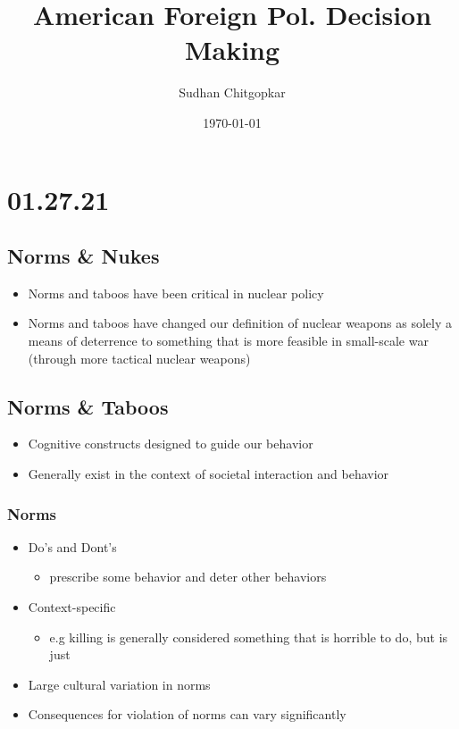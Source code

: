 \documentclass[11pt]{article}
\author{Sudhan Chitgopkar}
\date{\today}
\title{American Foreign Pol. Decision Making}
\begin{document}
\maketitle
\tableofcontents \clearpage\section{01.27.21}
\label{sec:orgcb806b3}
\subsection{Norms \& Nukes}
\label{sec:org7ab0f59}
\begin{itemize}
\item Norms and taboos have been critical in nuclear policy
\item Norms and taboos have changed our definition of nuclear weapons as solely a means of deterrence to something that is more feasible in small-scale war (through more tactical nuclear weapons)
\end{itemize}
\subsection{Norms \& Taboos}
\label{sec:orgdae8f54}
\begin{itemize}
\item Cognitive constructs designed to guide our behavior
\item Generally exist in the context of societal interaction and behavior
\end{itemize}
\subsubsection{Norms}
\label{sec:orgff2063e}
\begin{itemize}
\item Do's and Dont's
\begin{itemize}
\item prescribe some behavior and deter other behaviors
\end{itemize}
\item Context-specific
\begin{itemize}
\item e.g killing is generally considered something that is horrible to do, but is just
\end{itemize}
\item Large cultural variation in norms
\item Consequences for violation of norms can vary significantly
\end{itemize}
\end{document}
